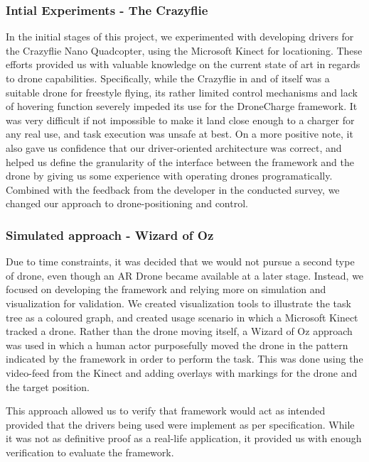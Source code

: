 \subsubsection{Intial Experiments - The Crazyflie}
In the initial stages of this project, we experimented with developing drivers for the Crazyflie Nano Quadcopter, using the Microsoft Kinect for locationing. These efforts provided us with valuable knowledge on the current state of art in regards to drone capabilities. Specifically, while the Crazyflie in and of itself was a suitable drone for freestyle flying, its rather limited control mechanisms and lack of hovering function severely impeded its use for the DroneCharge framework. It was very difficult if not impossible to make it land close enough to a charger for any real use, and task execution was unsafe at best. On a more positive note, it also gave us confidence that our driver-oriented architecture was correct, and helped us define the granularity of the interface between the framework and the drone by giving us some experience with operating drones programatically. Combined with the feedback from the developer in the conducted survey, we changed our approach to drone-positioning and control.

\subsubsection{Simulated approach - Wizard of Oz}
Due to time constraints, it was decided that we would not pursue a second type of drone, even though an AR Drone became available at a later stage. Instead, we focused on developing the framework and relying more on simulation and visualization for validation. We created visualization tools to illustrate the task tree as a coloured graph, and created usage scenario in which a Microsoft Kinect tracked a drone. Rather than the drone moving itself, a Wizard of Oz approach was used in which a human actor purposefully moved the drone in the pattern indicated by the framework in order to perform the task. This was done using the video-feed from the Kinect and adding overlays with markings for the drone and the target position.


This approach allowed us to verify that framework would act as intended provided that the drivers being used were implement as per specification.  While it was not as definitive proof as a real-life application, it provided us with enough verification to evaluate the framework.